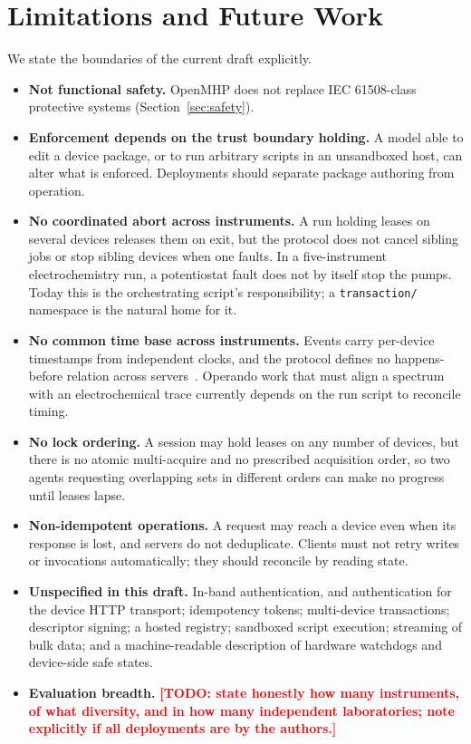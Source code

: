 \documentclass[11pt]{article}
\newcommand{\TODO}[1]{\textcolor{red}{\textbf{[TODO: #1]}}}
\begin{document}


\section{Limitations and Future Work}
\label{sec:limitations}

We state the boundaries of the current draft explicitly.

\begin{itemize}
  \item \textbf{Not functional safety.} OpenMHP does not replace IEC 61508-class protective
    systems (Section~\ref{sec:safety}).
  \item \textbf{Enforcement depends on the trust boundary holding.} A model able to edit a
    device package, or to run arbitrary scripts in an unsandboxed host, can alter what is
    enforced. Deployments should separate package authoring from operation.
  \item \textbf{No coordinated abort across instruments.} A run holding leases on several
    devices releases them on exit, but the protocol does not cancel sibling jobs or stop
    sibling devices when one faults. In a five-instrument electrochemistry run, a
    potentiostat fault does not by itself stop the pumps. Today this is the orchestrating
    script's responsibility; a \texttt{transaction/} namespace is the natural home for it.
  \item \textbf{No common time base across instruments.} Events carry per-device
    timestamps from independent clocks, and the protocol defines no happens-before relation
    across servers~\cite{lamport1978}. Operando work that must align a spectrum with an
    electrochemical trace currently depends on the run script to reconcile timing.
  \item \textbf{No lock ordering.} A session may hold leases on any number of devices, but
    there is no atomic multi-acquire and no prescribed acquisition order, so two agents
    requesting overlapping sets in different orders can make no progress until leases lapse.
  \item \textbf{Non-idempotent operations.} A request may reach a device even when its
    response is lost, and servers do not deduplicate. Clients must not retry writes or
    invocations automatically; they should reconcile by reading state.
  \item \textbf{Unspecified in this draft.} In-band authentication, and authentication for the
    device HTTP transport; idempotency tokens; multi-device transactions; descriptor signing;
    a hosted registry; sandboxed script execution; streaming of bulk data; and a
    machine-readable description of hardware watchdogs and device-side safe states.
  \item \textbf{Evaluation breadth.} \TODO{state honestly how many instruments, of what
    diversity, and in how many independent laboratories; note explicitly if all deployments
    are by the authors.}
\end{itemize}
\end{document}
